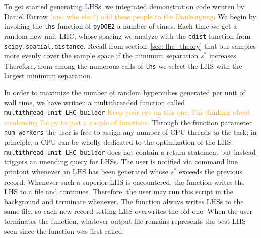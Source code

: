 To get started generating LHSs, we integrated demonstration code written by 
Daniel Farrow \textcolor{orange}{(and who else?) add these people to the 
Danksagung}. We begin by invoking the \texttt{lhs} function of
\texttt{pyDOE2} a number of times. Each time we get a random new unit LHC, 
whose spacing we analyze with the \texttt{cdist} function from
\texttt{scipy.spatial.distance}.
Recall from section~\ref{sec: lhc_theory} that
our samples more evenly cover the sample space if the minimum separation
$s^*$ increases. Therefore, from among the numerous calls of \texttt{lhs} we 
select the LHS with the largest minimum separation.

In order to maximize the number of random hypercubes generated per unit of
wall time, we have written a multithreaded function called
\verb|multithread_unit_LHC_builder| \textcolor{orange}{Keep your eye on this
one, I'm thinking about condensing lhc.py to just a couple of functions.}
Through the function parameter \verb|num_workers| the user is free to assign
any number of CPU threads to the task; in principle, a CPU can be
wholly dedicated to the optimization of the LHS.
\verb|multithread_unit_LHC_builder| does not contain a return statement but
instead triggers an unending query for LHSs. The user is notified via command
line printout whenever an LHS has been generated whose $s^*$ exceeds
the previous record. Whenever such a superior LHS is
encountered, the function writes the LHS to a file and continues. Therefore,
the user may run this script in the background and terminate whenever. The
function always writes LHSs to the same file, so each new record-setting LHS
overwrites the old one. When the user terminates the function, whatever output
file remains represents the best LHS seen since the function was first called.

\begin{comment}
The \verb|cdist| function can be re-used to compare LHSs loaded from 
different
files. However, since there is generally little reason to keep old LHSs
(except, perhaps, to reconstruct specific emulators), it reduces clutter to
simply continue overwriting the same file. Therefore, the function
\verb|multithread_unit_LHC_builder| also includes a parameter
\verb|previous_record|, which is recommended whenever the user would like to
stop the function and then resume it later. In such a case, the parameter
should be set to the \verb|cdist| value of the exis}
\end{comment}

